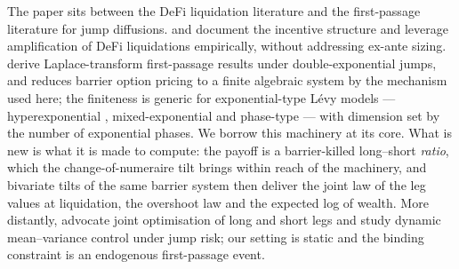 \documentclass[11pt]{article}
\theoremstyle{plain}
\theoremstyle{definition}
\theoremstyle{remark}
\begin{document}
The paper sits between the DeFi liquidation literature and the first-passage literature for jump
diffusions. \citet{Qin2021} and \citet{HeimbachHuang2024} document the incentive structure and
leverage amplification of DeFi liquidations empirically, without addressing ex-ante sizing.
\citet{KouWang2003} derive Laplace-transform first-passage results under double-exponential jumps,
and \citet{Sepp2004} reduces barrier option pricing to a finite algebraic system by the mechanism
used here; the finiteness is generic for exponential-type L\'evy models --- hyperexponential
\citep{Cai2009}, mixed-exponential \citep{CaiKou2011} and phase-type
\citep{AsmussenAvramPistorius2004} --- with dimension set by the number of exponential phases. We
borrow this machinery at its core. What is new is what it is made to compute: the payoff is a
barrier-killed long--short \emph{ratio}, which the change-of-numeraire tilt brings within reach of
the machinery, and bivariate tilts of the same barrier system then deliver the joint law of the leg
values at liquidation, the overshoot law and the expected log of wealth.
More distantly, \citet{JacobsLevyStarer1999} advocate joint optimisation of long and short legs and
\citet{DangForsyth2016} study dynamic mean--variance control under jump risk; our setting is static
and the binding constraint is an endogenous first-passage event.
\end{document}

